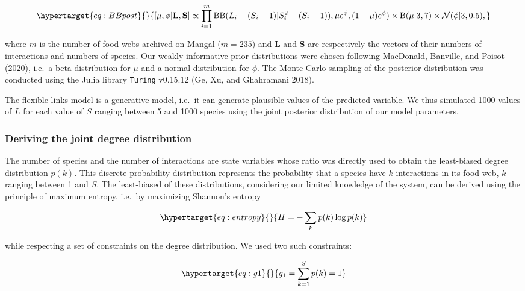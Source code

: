 \documentclass[11pt]{article}
\begin{document}
\begin{equation}\protect\hypertarget{eq:BBpost}{}{
[\mu, \phi| \textbf{L}, \textbf{S}] \propto \prod_{i = 1}^{m} \mathrm{BB}(L_i - (S_i - 1) | S_i^2 - (S_i - 1)), \mu e^{\phi}, (1 - \mu) e^\phi) \times \mathrm{B}(\mu| 3 , 7 ) \times \mathcal{N}(\phi | 3, 0.5),
}\label{eq:BBpost}\end{equation}

where \(m\) is the number of food webs archived on Mangal (\(m = 235\))
and \(\textbf{L}\) and \(\textbf{S}\) are respectively the vectors of
their numbers of interactions and numbers of species. Our
weakly-informative prior distributions were chosen following MacDonald,
Banville, and Poisot (2020), i.e.~a beta distribution for \(\mu\) and a
normal distribution for \(\phi\). The Monte Carlo sampling of the
posterior distribution was conducted using the Julia library
\texttt{Turing} v0.15.12 (Ge, Xu, and Ghahramani 2018).

The flexible links model is a generative model, i.e.~it can generate
plausible values of the predicted variable. We thus simulated 1000
values of \(L\) for each value of \(S\) ranging between 5 and 1000
species using the joint posterior distribution of our model parameters.

\hypertarget{deriving-the-joint-degree-distribution}{%
\subsubsection{Deriving the joint degree
distribution}\label{deriving-the-joint-degree-distribution}}

The number of species and the number of interactions are state variables
whose ratio was directly used to obtain the least-biased degree
distribution \(p(k)\). This discrete probability distribution represents
the probability that a species have \(k\) interactions in its food web,
\(k\) ranging between 1 and \(S\). The least-biased of these
distributions, considering our limited knowledge of the system, can be
derived using the principle of maximum entropy, i.e.~by maximizing
Shannon's entropy

\begin{equation}\protect\hypertarget{eq:entropy}{}{H = -\sum_{k} p(k) \log p(k)}\label{eq:entropy}\end{equation}

while respecting a set of constraints on the degree distribution. We
used two such constraints:

\begin{equation}\protect\hypertarget{eq:g1}{}{g_1 = \sum_{k=1}^{S} p(k) = 1}\label{eq:g1}\end{equation}
\end{document}
